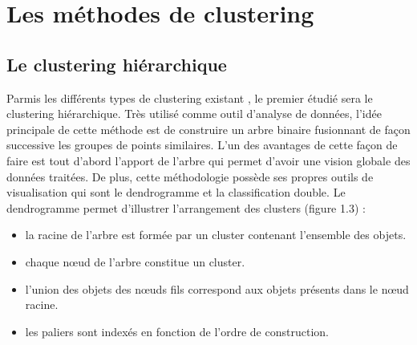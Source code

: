 \documentclass[memoire.tex]{subfiles}
\begin{document}
\section{Les méthodes de clustering}
		\subsection{Le clustering hiérarchique}
Parmis les différents types de clustering existant \cite{ref4}, le premier étudié sera le clustering hiérarchique. Très utilisé comme outil d'analyse de données, l'idée principale de cette méthode est de construire un arbre binaire fusionnant de façon successive les groupes de points similaires. L'un des avantages de cette façon de faire  est tout d'abord l'apport de l'arbre qui permet d'avoir une vision globale des données traitées. De plus, cette méthodologie possède ses propres outils de visualisation qui sont le dendrogramme et la classification double. Le dendrogramme permet d'illustrer l'arrangement des clusters (figure 1.3)\cite{ref8} :
\begin{itemize}
\item la racine de l'arbre est formée par un cluster contenant l'ensemble des objets.
\item chaque nœud de l'arbre constitue un cluster.
\item l'union des objets des nœuds fils correspond aux objets présents dans le nœud racine.
\item les paliers sont indexés en fonction de l'ordre de construction.
\end{itemize}
\end{document}
